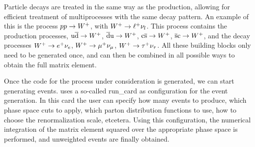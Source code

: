 Particle decays are treated in the same way as the production, allowing for efficient treatment of
multiprocesses with the same decay pattern. An example of this is the process ${p} {p} \rightarrow
W^+$, with $W^+ \rightarrow \ell^+ \nu_l$. This process contains the production
processes, $\mathrm{u} \overline{\mathrm{d}} \rightarrow W^+$, $\overline{\mathrm{d}} \mathrm{u} \rightarrow W^+$, $\mathrm{c} \overline{\mathrm{s}}
\rightarrow W^+$, $\overline{\mathrm{s}} \mathrm{c} \rightarrow W^+$, and the decay processes $W^+ \rightarrow
e^+ \nu_e$, $W^+ \rightarrow \mu^+ \nu_\mu$, $W^+ \rightarrow \tau^+ \nu_\tau$. 
All these building blocks only need to be generated once, and can then be combined in all possible
ways to obtain the full matrix element.  
 
Once the code for the process under consideration is generated, we can start generating events.
\MADGRAPH uses a so-called run\_card as configuration for the event generation. In this card the
user can specify how many events to produce, which phase space cuts to apply, which parton
distribution functions to use, how to choose the renormalization scale, etcetera. Using this
configuration, the numerical integration of the matrix element squared over the appropriate phase
space is performed, and unweighted events are finally obtained. 


